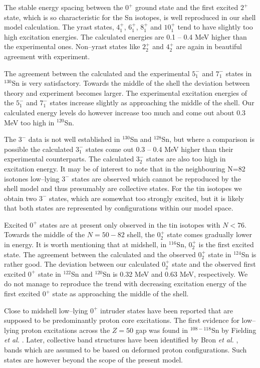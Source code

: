 The stable energy spacing between the $0^{+}$ ground state and the first
excited $2^{+}$ state, which is so characteristic for the Sn isotopes, is well
reproduced in our shell model calculation.
The yrast states, $4^{+}_{1}$, $6^{+}_{1}$, $8^{+}_{1}$ and $10^{+}_{1}$ 
tend to have slightly too high excitation energies. The calculated energies
are 0.1 -- 0.4 MeV higher than the experimental ones.
Non--yrast states like $2^+_2$ and $4^+_2$ are again in beautiful agreement 
with experiment. 

The agreement between the calculated and the experimental $5^-_1$ and $7^-_1$ 
states in $^{130}$Sn is very satisfactory. Towards the middle of the shell
the deviation between theory and experiment becomes larger. The
experimental excitation energies of the $5^-_1$ and $7^-_1$ states increase 
slightly as approaching the middle of the shell. Our calculated energy 
levels do however increase too much and come out about 0.3 MeV too high in 
$^{120}$Sn. 

The $3^-$ data is not well established in $^{130}$Sn and 
$^{128}$Sn, but where a comparison is possible the calculated $3^{-}_{1}$ 
states come out 0.3 -- 0.4 MeV higher than their experimental counterparts.
The calculated $3^{-}_{2}$ states are also too high in excitation energy.
It may be of interest to note that in the neighbouring N=82 isotones 
low--lying $3^{-}$ states are observed which cannot be reproduced by the 
shell model \cite{holt97} and thus presumably are collective states. 
For the tin isotopes we obtain  two $3^{-}$ states, which are somewhat 
too strongly excited, but it is likely that both states are represented
by configurations within our model space.

Excited $0^{+}$ states are at present only observed in the tin isotopes
with $N<76$. Towards the middle of the $N=50-82$ shell, the $0^{+}_{2}$ state 
comes gradually lower in energy. It is worth mentioning that at midshell, 
in $^{116}$Sn, $0^{+}_{2}$ is the first excited state.
The agreement between the calculated and the observed $0^{+}_{2}$ state in 
$^{124}$Sn is rather good. The deviation between our 
calculated $0^{+}_{2}$ state and the observed first excited $0^{+}$ state 
in $^{122}$Sn and $^{120}$Sn is 0.32 MeV and 0.63 MeV, respectively.
We do not manage to reproduce the trend with decreasing excitation energy of
the first excited $0^{+}$ state as approaching the middle of the shell.

Close to midshell low--lying $0^+$ intruder states have been reported 
that are supposed to be predominantly proton core excitations. The first 
evidence for low--lying proton excitations across the $Z=50$ gap was found 
in $^{108-118}$Sn by Fielding {\em et al.} \cite{fiel77}. Later, collective 
band structures have been identified by Bron {\em et al.} \cite{bron79},
bands which are assumed to be based on deformed proton configurations.
Such states are however beyond the scope of the present model.


